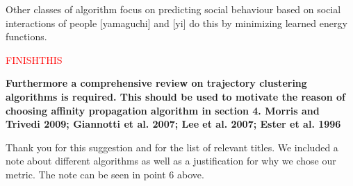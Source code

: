 \documentclass[usenames,dvipsnames]{article}
\newcommand{\todo}[1]{\textcolor{red}{#1}}
\providecommand{\response}[1]{
\noindent
\noindent\colorbox{gray!20}{
\parbox{\textwidth}{
\setlength{\parskip}{.1in}
\setlength{\parindent}{.1in}
#1}
}
}
\begin{document}
\begin{enumerate}
\response{Other classes of algorithm focus on predicting social behaviour based on  social interactions of people 
	[yamaguchi] and [yi] do this by minimizing learned energy functions. }
\todo{FINISHTHIS}
\begin{item}
\textbf{Furthermore a comprehensive review on trajectory clustering algorithms
is required. This should be used to motivate the reason of choosing
affinity propagation algorithm in section 4. 
Morris and Trivedi 2009; Giannotti et al. 2007; Lee et al. 2007;
Ester et al. 1996 }

Thank you for this suggestion and for the list of relevant titles. We included a note about different algorithms as well as a justification for why we chose our metric. The note can be seen in point 6 above.

\end{item}
\end{enumerate}
\end{document}
